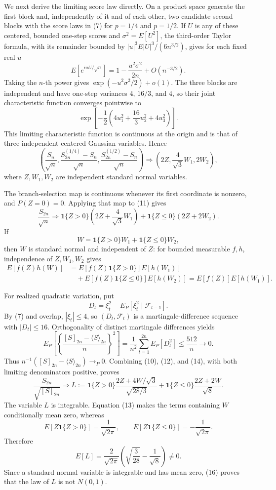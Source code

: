 We next derive the limiting score law directly.  On a product space generate the first block and, independently of it and of each other, two candidate second blocks with the score laws in (7) for \(p=1/4\) and \(p=1/2\).  If \(U\) is any of these centered, bounded one-step scores and \(\sigma^2=E[U^2]\), the third-order Taylor formula, with its remainder bounded by \(|u|^3E|U|^3/(6n^{3/2})\), gives for each fixed real \(u\)
\[
E[e^{iuU/\sqrt n}]
=1-\frac{u^2\sigma^2}{2n}+O(n^{-3/2}).
\]
Taking the \(n\)-th power gives \(\exp(-u^2\sigma^2/2)+o(1)\).  The three blocks are independent and have one-step variances \(4\), \(16/3\), and \(4\), so their joint characteristic function converges pointwise to
\[
\exp\!\left[-\frac12\left(4u_1^2+\frac{16}{3}u_2^2+4u_3^2\right)\right].
\]
This limiting characteristic function is continuous at the origin and is that of three independent centered Gaussian variables.  Hence
\[
\left(
\frac{S_n}{\sqrt n},
\frac{S^{(1/4)}_{2n}-S_n}{\sqrt n},
\frac{S^{(1/2)}_{2n}-S_n}{\sqrt n}
\right)
\Longrightarrow
\left(2Z,\frac4{\sqrt3}W_1,2W_2\right),
\tag{11}
\]
where \(Z,W_1,W_2\) are independent standard normal variables.

The branch-selection map is continuous whenever its first coordinate is nonzero, and \(P(Z=0)=0\).  Applying that map to (11) gives
\[
\frac{S_{2n}}{\sqrt n}
\Longrightarrow
\mathbf1\{Z>0\}\left(2Z+\frac4{\sqrt3}W_1\right)
+\mathbf1\{Z\le0\}(2Z+2W_2).
\tag{12}
\]
If
\[
W=\mathbf1\{Z>0\}W_1+\mathbf1\{Z\le0\}W_2,
\]
then \(W\) is standard normal and independent of \(Z\): for bounded measurable \(f,h\), independence of \(Z,W_1,W_2\) gives
\[
\begin{aligned}
E[f(Z)h(W)]
&=E[f(Z)\mathbf1\{Z>0\}]E[h(W_1)]\\
&\quad+E[f(Z)\mathbf1\{Z\le0\}]E[h(W_2)]
=E[f(Z)]E[h(W_1)].
\end{aligned}
\tag{13}
\]

For realized quadratic variation, put
\[
D_t=\xi_t^2-E_P[\xi_t^2\mid\mathcal F_{t-1}].
\]
By (7) and overlap, \(|\xi_t|\le4\), so \((D_t,\mathcal F_t)\) is a martingale-difference sequence with \(|D_t|\le16\).  Orthogonality of distinct martingale differences yields
\[
E_P\!\left[\left\{\frac{[S]_{2n}-\langle S\rangle_{2n}}{n}\right\}^2\right]
=\frac1{n^2}\sum_{t=1}^{2n}E_P[D_t^2]
\le\frac{512}{n}\longrightarrow0.
\tag{14}
\]
Thus \(n^{-1}([S]_{2n}-\langle S\rangle_{2n})\to_P0\).  Combining (10), (12), and (14), with both limiting denominators positive, proves
\[
\frac{S_{2n}}{\sqrt{[S]_{2n}}}
\Longrightarrow
L:=\mathbf1\{Z>0\}\frac{2Z+4W/\sqrt3}{\sqrt{28/3}}
+\mathbf1\{Z\le0\}\frac{2Z+2W}{\sqrt8}.
\tag{15}
\]
The variable \(L\) is integrable.  Equation (13) makes the terms containing \(W\) conditionally mean zero, whereas
\[
E[Z\mathbf1\{Z>0\}]=\frac1{\sqrt{2\pi}},
\qquad
E[Z\mathbf1\{Z\le0\}]=-\frac1{\sqrt{2\pi}}.
\]
Therefore
\[
E[L]=\frac2{\sqrt{2\pi}}
\left(\sqrt{\frac3{28}}-\frac1{\sqrt8}\right)\ne0.
\tag{16}
\]
Since a standard normal variable is integrable and has mean zero, (16) proves that the law of \(L\) is not \(N(0,1)\).


